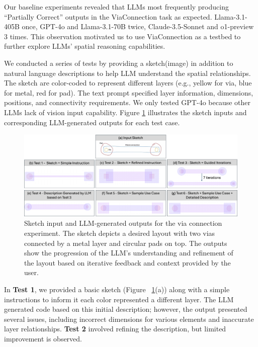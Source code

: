 \documentclass{article}
\begin{document}
Our baseline experiments revealed that LLMs most frequently producing ``Partially Correct'' outputs in the ViaConnection task as expected. Llama-3.1-405B once, GPT-4o and Llama-3.1-70B twice, Claude-3.5-Sonnet and o1-preview 3 times. This observation motivated us to use ViaConnection as a testbed to further explore LLMs' spatial reasoning capabilities.

We conducted a series of tests by providing a sketch(image) in addition to natural language descriptions to help LLM understand the spatial relationships. The sketch are color-coded to represent different layers (e.g., yellow for via, blue for metal, red for pad). The text prompt specified layer information, dimensions, positions, and connectivity requirements. We only tested GPT-4o because other LLMs lack of vision input capability. Figure \ref{fig:via_experiment} illustrates the sketch inputs and corresponding LLM-generated outputs for each test case.

\begin{figure}[!h]
\centering
\includegraphics[width=1\linewidth]{Figure1_v3.png}
\caption{Sketch input and LLM-generated outputs for the via connection experiment. The sketch depicts a desired layout with two vias connected by a metal layer and circular pads on top. The outputs show the progression of the LLM's understanding and refinement of the layout based on iterative feedback and context provided by the user.}
\label{fig:via_experiment}
\end{figure}
In \textbf{Test 1}, we provided a basic sketch (Figure ~\ref{fig:via_experiment}(a)) along with a simple instructions to inform it each color represented a different layer. The LLM generated code based on this initial description; however, the output presented several issues, including incorrect dimensions for various elements and inaccurate layer relationships. \textbf{Test 2} involved refining the description, but limited improvement is observed. 
\end{document}
